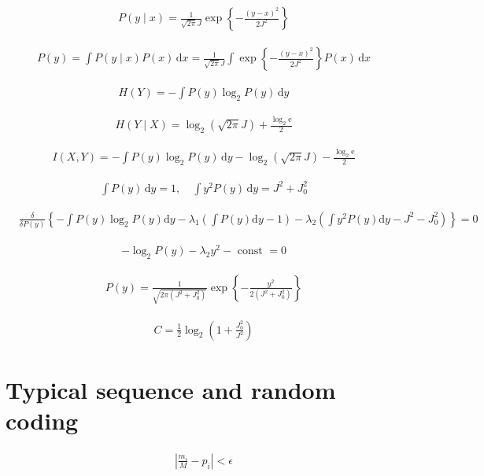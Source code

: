 \documentclass{article}
\begin{document}
\begin{align*}
P(y \mid x) = \frac{1}{\sqrt{2 \pi} J} \exp \left\{-\frac{(y - x)^2}{2 J^2}\right\} 
\tag{C.21}
\end{align*}

\begin{align*}
P(y) = \int P(y \mid x) P(x) \, \mathrm{d} x = \frac{1}{\sqrt{2 \pi} J} \int \exp \left\{-\frac{(y - x)^2}{2 J^2}\right\} P(x) \, \mathrm{d} x 
\tag{C.22}
\end{align*}

\begin{align*}
H(Y) = -\int P(y) \log_2 P(y) \, \mathrm{d} y 
\tag{C.23}
\end{align*}

\begin{align*}
H(Y \mid X) = \log_2(\sqrt{2 \pi} J) + \frac{\log_2 \mathrm{e}}{2} 
\tag{C.24}
\end{align*}

\begin{align*}
I(X, Y) = -\int P(y) \log_2 P(y) \, \mathrm{d} y - \log_2(\sqrt{2 \pi} J) - \frac{\log_2 \mathrm{e}}{2} 
\tag{C.25}
\end{align*}

\begin{align*}
\int P(y) \, \mathrm{d} y = 1, \quad \int y^2 P(y) \, \mathrm{d} y = J^2 + J_0^2 
\tag{C.26}
\end{align*}

\begin{align*}
& \frac{\delta}{\delta P(y)}\left\{-\int P(y) \log _{2} P(y) \mathrm{d} y -\lambda_{1}\left(\int P(y) \mathrm{d} y-1\right)-\lambda_{2}\left(\int y^{2} P(y) \mathrm{d} y-J^{2}-J_{0}^{2}\right)\right\}=0
\tag{C.27}
\end{align*}


\begin{align*}
-\log _{2} P(y)-\lambda_{2} y^{2}-\text { const }=0 \tag{C.28}
\end{align*}

\begin{align*}
P(y) = \frac{1}{\sqrt{2 \pi(J^2 + J_0^2)}} \exp \left\{-\frac{y^2}{2(J^2 + J_0^2)}\right\} 
\tag{C.29}
\end{align*}

\begin{align*}
C = \frac{1}{2} \log_2 \left(1 + \frac{J_0^2}{J^2}\right) 
\tag{C.30}
\end{align*}

\section{Typical sequence and random coding}
\begin{align*}
\left|\frac{m_{i}}{M} - p_{i}\right| < \epsilon 
\tag{C.31}
\end{align*}
\end{document}
